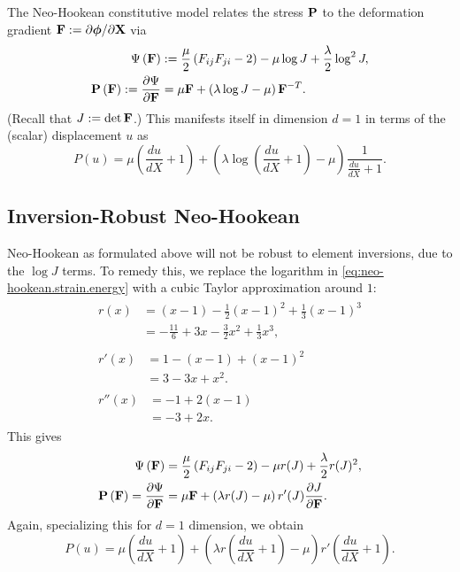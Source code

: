 The Neo-Hookean constitutive model relates the stress $\mathbf{P}$ to the deformation gradient $\mathbf{F} := \partial\boldsymbol{\phi}/\partial\mathbf{X}$ via
\begin{subequations}
\begin{align}
\Psi \left( \mathbf{F} \right) & := \frac{\mu}{2} \left( F_{ij} F_{ji} - 2 \right) - \mu \log J + \frac{\lambda}{2} \log^2 J, \label{eq:neo-hookean.strain.energy} \\
\mathbf{P} \left( \mathbf{F} \right) := \frac{\partial \Psi}{\partial \mathbf{F}} & = \mu \mathbf{F} + \left( \lambda \log J - \mu \right) \mathbf{F}^{-T}.
\end{align}
\end{subequations}
(Recall that $J := \det \mathbf{F}$.) This manifests itself in dimension $d = 1$ in terms of the (scalar) displacement $u$ as
\begin{equation*}
P(u) = \mu \left( \frac{du}{dX} + 1 \right) + \left( \lambda \log \left( \frac{du}{dX} + 1 \right) - \mu \right) \frac{1}{\frac{du}{dX} + 1}.
\end{equation*}

\subsection{Inversion-Robust Neo-Hookean}

Neo-Hookean as formulated above will not be robust to element inversions, due to the $\log J$ terms. To remedy this, we replace the logarithm in \eqref{eq:neo-hookean.strain.energy} with a cubic Taylor approximation around $1$:
\begin{subequations}\label{eq:r}
\begin{align}
\begin{split}
r(x) & = (x - 1) - \frac{1}{2} (x - 1)^2 + \frac{1}{3} (x - 1)^3 \\
     & = -\frac{11}{6} + 3 x - \frac{3}{2} x^2 + \frac{1}{3} x^3,
\end{split} \\
\begin{split}
r'(x) & = 1 - (x - 1) + (x - 1)^2 \\
      & = 3 - 3 x + x^2.
\end{split} \\
\begin{split}
r''(x) & = -1 + 2 (x - 1) \\
       & = -3 + 2 x.
\end{split}
\end{align}
\end{subequations}
This gives
\begin{align*}
\Psi \left( \mathbf{F} \right) & = \frac{\mu}{2} \left( F_{ij} F_{ji} - 2 \right) - \mu r(J) + \frac{\lambda}{2} r(J)^2, \\ \mathbf{P} \left( \mathbf{F} \right) = \frac{\partial \Psi}{\partial \mathbf{F}} & = \mu \mathbf{F} + \left( \lambda r(J) - \mu \right) r'(J) \frac{\partial J}{\partial \mathbf{F}}.
\end{align*}
Again, specializing this for $d = 1$ dimension, we obtain
\begin{equation}\label{eq:P.1d}
P(u) = \mu \left( \frac{du}{dX} + 1 \right) + \left( \lambda r \left( \frac{du}{dX} + 1 \right) - \mu \right) r' \left( \frac{du}{dX} + 1 \right).
\end{equation}

